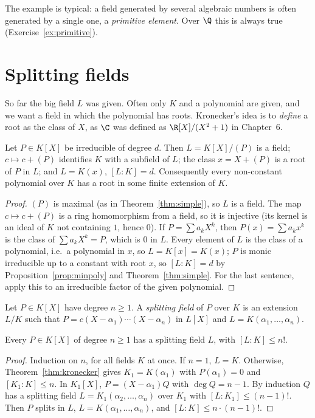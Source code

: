 The example is typical: a field generated by several algebraic numbers is often generated by a single one, a \emph{primitive element}. Over $\Q$ this is always true (Exercise~\ref{ex:primitive}).

\section{Splitting fields}\label{sec:splitting}

So far the big field $L$ was given. Often only $K$ and a polynomial are given, and we want a field in which the polynomial has roots. Kronecker's idea is to \emph{define} a root as the class of $X$, as $\C$ was defined as $\R[X]/(X^2+1)$ in Chapter~6.

\begin{theorem}[Kronecker]\label{thm:kronecker}
Let $P\in K[X]$ be irreducible of degree $d$. Then $L=K[X]/(P)$ is a field; $c\mapsto c+(P)$ identifies $K$ with a subfield of $L$; the class $x=X+(P)$ is a root of $P$ in $L$; and $L=K(x)$, $[L:K]=d$. Consequently every non-constant polynomial over $K$ has a root in some finite extension of $K$.
\end{theorem}
\begin{proof}
$(P)$ is maximal (as in Theorem~\ref{thm:simple}), so $L$ is a field. The map $c\mapsto c+(P)$ is a ring homomorphism from a field, so it is injective (its kernel is an ideal of $K$ not containing $1$, hence $0$). If $P=\sum a_kX^k$, then $P(x)=\sum a_kx^k$ is the class of $\sum a_kX^k=P$, which is $0$ in $L$. Every element of $L$ is the class of a polynomial, i.e.\ a polynomial in $x$, so $L=K[x]=K(x)$; $P$ is monic irreducible up to a constant with root $x$, so $[L:K]=d$ by Proposition~\ref{prop:minpoly} and Theorem~\ref{thm:simple}. For the last sentence, apply this to an irreducible factor of the given polynomial.
\end{proof}

\begin{definition}
Let $P\in K[X]$ have degree $n\ge1$. A \emph{splitting field} of $P$ over $K$ is an extension $L/K$ such that $P=c(X-\alpha_1)\cdots(X-\alpha_n)$ in $L[X]$ and $L=K(\alpha_1,\dots,\alpha_n)$.
\end{definition}

\begin{proposition}\label{prop:splitexists}
Every $P\in K[X]$ of degree $n\ge1$ has a splitting field $L$, with $[L:K]\le n!$.
\end{proposition}
\begin{proof}
Induction on $n$, for all fields $K$ at once. If $n=1$, $L=K$. Otherwise, Theorem~\ref{thm:kronecker} gives $K_1=K(\alpha_1)$ with $P(\alpha_1)=0$ and $[K_1:K]\le n$. In $K_1[X]$, $P=(X-\alpha_1)Q$ with $\deg Q=n-1$. By induction $Q$ has a splitting field $L=K_1(\alpha_2,\dots,\alpha_n)$ over $K_1$ with $[L:K_1]\le(n-1)!$. Then $P$ splits in $L$, $L=K(\alpha_1,\dots,\alpha_n)$, and $[L:K]\le n\cdot(n-1)!$.
\end{proof}

